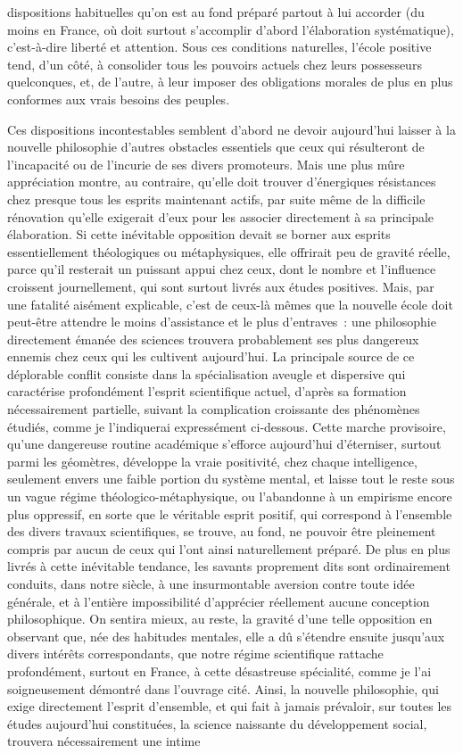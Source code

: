\documentclass[french,twoside]{book} %
\begin{document}
dispositions habituelles qu’on est au fond préparé partout à lui accorder (du moins en France, où doit surtout s’accomplir d’abord l’élaboration systématique), c’est-à-dire liberté et attention. Sous ces conditions naturelles, l’école positive tend, d’un côté, à consolider tous les pouvoirs actuels chez leurs possesseurs quelconques, et, de l’autre, à leur imposer des obligations morales de plus en plus conformes aux vrais besoins des peuples.\par
Ces dispositions incontestables semblent d’abord ne devoir aujourd’hui laisser à la nouvelle philosophie d’autres obstacles essentiels que ceux qui résulteront de l’incapacité ou de l’incurie de ses divers promoteurs. Mais une plus mûre appréciation montre, au contraire, qu’elle doit trouver d’énergiques résistances chez presque tous les esprits maintenant actifs, par suite même de la difficile rénovation qu’elle exigerait d’eux pour les associer directement à sa principale élaboration. Si cette inévitable opposition devait se borner aux esprits essentiellement théologiques ou métaphysiques, elle offrirait peu de gravité réelle, parce qu’il resterait un puissant appui chez ceux, dont le nombre et l’influence croissent journellement, qui sont surtout livrés aux études positives. Mais, par une fatalité aisément explicable, c’est de ceux-là mêmes que la nouvelle école doit peut-être attendre le moins d’assistance et le plus d’entraves : une philosophie directement émanée des sciences trouvera probablement ses plus dangereux ennemis chez ceux qui les cultivent aujourd’hui. La principale source de ce déplorable conflit consiste dans la spécialisation aveugle et dispersive qui caractérise profondément l’esprit scientifique actuel, d’après sa formation nécessairement partielle, suivant la complication croissante des phénomènes étudiés, comme je l’indiquerai expressément ci-dessous. Cette marche provisoire, qu’une dangereuse routine académique s’efforce aujourd’hui d’éterniser, surtout parmi les géomètres, développe la vraie positivité, chez chaque intelligence, seulement envers une faible portion du système mental, et laisse tout le reste sous un vague régime théologico-métaphysique, ou l’abandonne à un empirisme encore plus oppressif, en sorte que le véritable esprit positif, qui correspond à l’ensemble des divers travaux scientifiques, se trouve, au fond, ne pouvoir être pleinement compris par aucun de ceux qui l’ont ainsi naturellement préparé. De plus en plus livrés à cette inévitable tendance, les savants proprement dits sont ordinairement conduits, dans notre siècle, à une insurmontable aversion contre toute idée générale, et à l’entière impossibilité d’apprécier réellement aucune conception philosophique. On sentira mieux, au reste, la gravité d’une telle opposition en observant que, née des habitudes mentales, elle a dû s’étendre ensuite jusqu’aux divers intérêts correspondants, que notre régime scientifique rattache profondément, surtout en France, à cette désastreuse spécialité, comme je l’ai soigneusement démontré dans l’ouvrage cité. Ainsi, la nouvelle philosophie, qui exige directement l’esprit d’ensemble, et qui fait à jamais prévaloir, sur toutes les études aujourd’hui constituées, la science naissante du développement social, trouvera nécessairement une intime 
\end{document}
